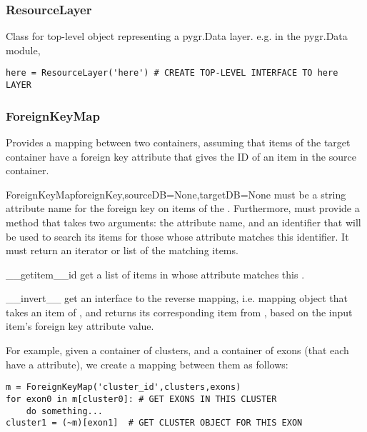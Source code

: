 \documentclass{howto}
\begin{document}
\subsubsection{ResourceLayer}
Class for top-level object representing a pygr.Data layer.  e.g. in the pygr.Data
module,
\begin{verbatim}
here = ResourceLayer('here') # CREATE TOP-LEVEL INTERFACE TO here LAYER
\end{verbatim}

\subsubsection{ForeignKeyMap}
Provides a mapping between two containers, assuming that items of the target
container have a foreign key attribute that gives the ID of an item in the source
container.
\begin{funcdesc}{ForeignKeyMap}{foreignKey,sourceDB=None,targetDB=None}
   must be a string attribute name for the foreign key on
  items of the .  Furthermore,  must provide
  a  method that takes two arguments: the  attribute name,
  and an identifier that will be used to search its items for those whose attribute
  matches this identifier.  It must return an iterator or list of the matching items.
\end{funcdesc}

\begin{funcdesc}{__getitem__}{id}
  get a list of items in  whose attribute matches this .
\end{funcdesc}

\begin{funcdesc}{__invert__}{}
  get an interface to the reverse mapping, i.e. mapping object that takes an
  item of , and returns its corresponding item from ,
  based on the input item's foreign key attribute value.
\end{funcdesc}

For example, given a container of clusters, and a container of exons (that each
have a  attribute), we create a mapping between them as follows:
\begin{verbatim}
m = ForeignKeyMap('cluster_id',clusters,exons)
for exon0 in m[cluster0]: # GET EXONS IN THIS CLUSTER
    do something...
cluster1 = (~m)[exon1]  # GET CLUSTER OBJECT FOR THIS EXON
\end{verbatim}
\end{document}
